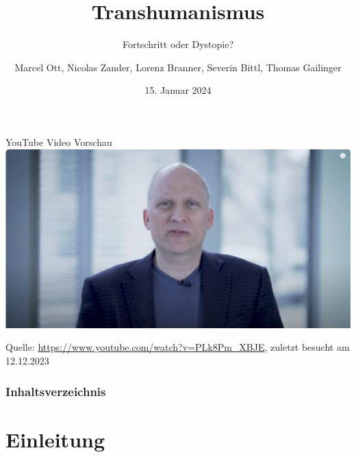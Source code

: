 \documentclass[aspectratio=169,16pt,xcolor=table]{beamer}
\date{15. Januar 2024}
\begin{document}
\begin{frame}{YouTube Video Vorschau}
  \centering
  \href{https://www.youtube.com/watch?v=PLk8Pm_XBJE&t=612s}{\includegraphics[width=0.8\linewidth]{pictures/Video_Vorschau.png}}
  \vspace{-0.2cm}
  \begin{flushleft}
      \tiny Quelle: \url{https://www.youtube.com/watch?v=PLk8Pm_XBJE}, zuletzt besucht am 12.12.2023
  \end{flushleft}
\end{frame}

\title{Transhumanismus}
\subtitle{Fortschritt oder Dystopie?}
\author{Marcel Ott, Nicolas Zander, Lorenz Branner, Severin Bittl, Thomas Gailinger}

\maketitle

\begin{frame}[allowframebreaks]
	\frametitle{Inhaltsverzeichnis}
	\tableofcontents
\end{frame}

\section{Einleitung}
\end{document}
